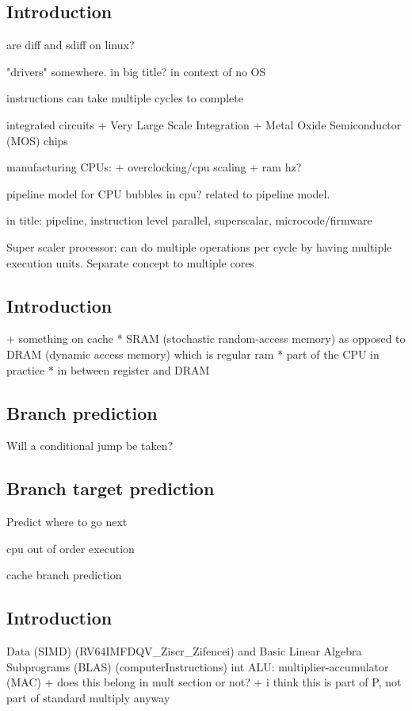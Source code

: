 
\subsection{Introduction}

are diff and sdiff on linux?

"drivers" somewhere. in big title?
in context of no OS

instructions can take multiple cycles to complete

integrated circuits
+ Very Large Scale Integration
+ Metal Oxide Semiconductor (MOS) chips

manufacturing CPUs:
+ overclocking/cpu scaling
+ ram hz?

pipeline model for CPU
bubbles in cpu? related to pipeline model.

in title: pipeline, instruction level parallel, superscalar, microcode/firmware

Super scaler processor: can do multiple operations per cycle by having multiple execution units. Separate concept to multiple cores






\subsection{Introduction}

+ something on cache
  * SRAM (stochastic random-access memory) as opposed to DRAM (dynamic access memory) which is regular ram
  * part of the CPU in practice
  * in between register and DRAM

\subsection{Branch prediction}
Will a conditional jump be taken?

\subsection{Branch target prediction}
Predict where to go next

cpu out of order execution

cache
branch prediction


\subsection{Introduction}

Data (SIMD) (RV64IMFDQV\_Ziscr\_Zifencei) and Basic Linear Algebra Subprograms (BLAS) (computerInstructions)
int ALU: multiplier-accumulator (MAC)
+ does this belong in mult section or not?
+ i think this is part of P, not part of standard multiply anyway

